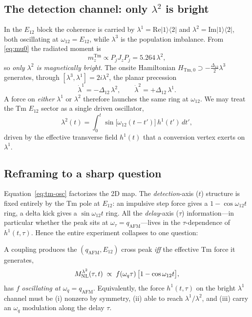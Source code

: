 \documentclass[11pt,a4paper]{article}
\newcommand{\Tm}{\mathrm{Tm}}
\newcommand{\ket}[1]{|#1\rangle}
\newcommand{\bra}[1]{\langle #1|}
\begin{document}
\subsection{The detection channel: only $\lambda^2$ is bright}

In the $E_{12}$ block the coherence is carried by $\lambda^1=\mathrm{Re}\ket1\bra2$
and $\lambda^2=\mathrm{Im}\ket1\bra2$, both oscillating at $\omega_{12}=E_{12}$,
while $\lambda^3$ is the population imbalance.  From \eqref{eq:mu0} the radiated
moment is
\begin{equation}
  m_z^{\Tm}\propto P_jJ_zP_j=5.264\,\lambda^2,
\end{equation}
so \emph{only $\lambda^2$ is magnetically bright}.  The onsite Hamiltonian
$H_{\Tm,0}\supset-\tfrac{\Delta_{12}}{2}\lambda^3$ generates, through
$[\lambda^3,\lambda^1]=2i\lambda^2$, the planar precession
\begin{equation}
  \dot\lambda^1=-\Delta_{12}\,\lambda^2,\qquad
  \dot\lambda^2=+\Delta_{12}\,\lambda^1 .
\end{equation}
A force on \emph{either} $\lambda^1$ or $\lambda^2$ therefore launches the same
ring at $\omega_{12}$.  We may treat the Tm $E_{12}$ sector as a single driven
oscillator,
\begin{equation}
  \lambda^2(t)=\int_0^t\sin\!\big[\omega_{12}(t-t')\big]\,h^1(t')\,dt',
  \label{eq:tm-osc}
\end{equation}
driven by the effective transverse field $h^1(t)$ that a conversion vertex
exerts on $\lambda^1$.

\subsection{Reframing to a sharp question}

Equation~\eqref{eq:tm-osc} factorizes the 2D map.  The \emph{detection}-axis
($t$) structure is fixed entirely by the Tm pole at $E_{12}$: an impulsive
step force gives a $1-\cos\omega_{12}t$ ring, a delta kick gives a
$\sin\omega_{12}t$ ring.  All the \emph{delay}-axis ($\tau$) information---in
particular whether the peak sits at $\omega_\tau=q_{\mathrm{AFM}}$---lives in the
$\tau$-dependence of $h^1(t,\tau)$.  Hence the entire experiment collapses to
one question:

\begin{keybox}[title={The sharp question}]
A coupling produces the $(q_{\mathrm{AFM}},E_{12})$ cross peak \emph{iff} the
effective Tm force it generates,
\begin{equation}
  M_{\rm NL}^{\lambda^2}(\tau,t)\;\propto\;f(\omega_q\tau)\,\big[1-\cos\omega_{12}t\big],
\end{equation}
has $f$ \emph{oscillating at $\omega_q=q_{\mathrm{AFM}}$}.  Equivalently, the
force $h^1(t,\tau)$ on the bright $\lambda^1$ channel must be (i) nonzero by
symmetry, (ii) able to reach $\lambda^1/\lambda^2$, and (iii) carry an $\omega_q$
modulation along the delay $\tau$.
\end{keybox}
\end{document}
